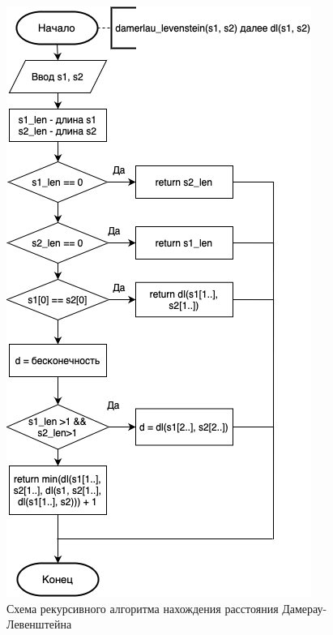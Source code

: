 \documentclass[12pt]{report}
\begin{document}
\begin{figure}[h]
	\centering
	\includegraphics[width=0.5\linewidth]{dam_lev_rec.png}
	\caption{Схема рекурсивного алгоритма нахождения расстояния Дамерау-Левенштейна}
	\label{fig:mpr}
\end{figure}
\end{document}
